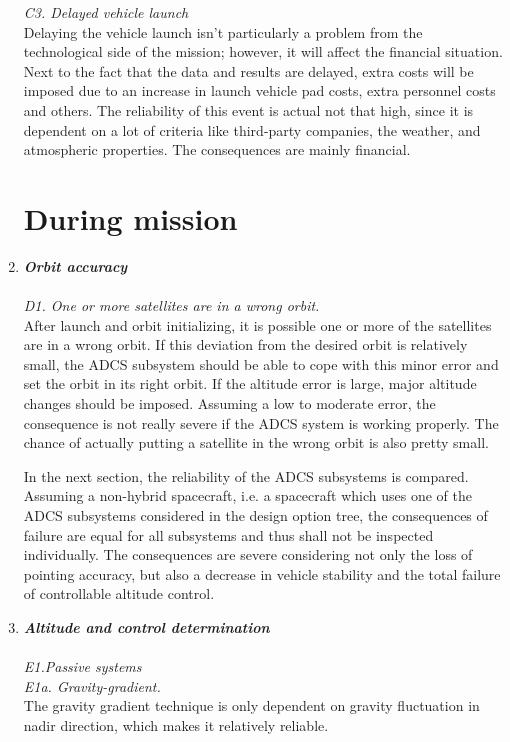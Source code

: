 \begin{enumerate}[A]
\textit{C3. Delayed vehicle launch}\\
Delaying the vehicle launch isn't particularly a problem from the technological side of the mission; however, it will affect the financial situation. Next to the fact that the data and results are delayed, extra costs will be imposed due to an increase in launch vehicle pad costs, extra personnel costs and others. The reliability of this event is actual not that high, since it is dependent on a lot of criteria like third-party companies, the weather, and atmospheric properties. The consequences are mainly financial.

\section{During mission}
\label{blTRADm}
	\item  \textbf{\textit{Orbit accuracy }} \\\\
\textit{D1. One or more satellites are in a wrong orbit.}\\
After launch and orbit initializing, it is possible one or more of the satellites are in a wrong orbit. If this deviation from the desired orbit is relatively small, the ADCS subsystem should be able to cope with this minor error and set the orbit in its right orbit. If the altitude error is large, major altitude changes should be imposed. Assuming a low to moderate error, the consequence is not really severe if the ADCS system is working properly. The chance of actually putting a satellite in the wrong orbit is also pretty small.

In the next section, the reliability of the ADCS subsystems is compared. Assuming a non-hybrid spacecraft, i.e. a spacecraft which uses one of the ADCS subsystems considered in the design option tree, the consequences of failure are equal for all subsystems and thus shall not be inspected individually. The consequences are severe considering not only the loss of pointing accuracy, but also a decrease in vehicle stability and the total failure of controllable altitude control.  	

	\item  \textbf{\textit{Altitude and control determination }} \\\\
\textit{E1.Passive systems}\\

\textit{E1a. Gravity-gradient.}\\
The gravity gradient technique is only dependent on gravity fluctuation in nadir direction, which makes it relatively reliable.


\end{enumerate}
